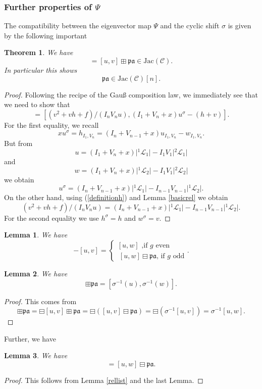\documentclass[11pt, a4paper]{amsart}
\newcommand{\jac}{\mathrm{Jac(\mathcal C)}}
\newcommand{\eqst}[1]{\begin{equation*}#1\end{equation*}}
\theoremstyle{plain}
\newtheorem{theorem}{Theorem}[section]
\newtheorem{lemma}{Lemma}[section]
\numberwithin{equation}{section}
\begin{document}
\subsubsection{Further properties of $\Psi$}
The compatibility between the eigenvector map $\Psi$ and the cyclic shift $\sigma$ is given by the following important
\begin{theorem}
\label{torsionpoint}
We have \eqst{[u^\sigma,v^\sigma] = [u,v] \boxplus \mathfrak{pa} \in \jac.}
In particular this shows \eqst{\mathfrak{pa} \in \mathrm{Jac}(\mathcal C)[n].}
\end{theorem}
\begin{proof}
Following the recipe of the Gauß composition law, we immediately see that we need to show that 
\eqst{[u^\sigma,v^\sigma] = [(v^2+v h +f) /(I_n V_n u),(I_1+V_n+x) u^\sigma-(h+v)].}
For the first equality, we recall \eqst{x u^\sigma = h_{I_1,V_n} = (I_n+V_{n-1}+x)u_{I_1,V_n}-w_{I_1,V_n}.}
But from \eqst{u = (I_1+V_n+x)\vert {}^1\mathcal L _1\vert - I_1V_1 \vert{}^2\mathcal L_1\vert} and \eqst{w = (I_1+V_n+x)\vert {}^1\mathcal L _2\vert - I_1V_1 \vert{}^2\mathcal L_2\vert} we obtain \eqst{u^\sigma = (I_n+V_{n-1}+x) \vert{}^1\mathcal L _1 \vert - I_{n-1} V_{n-1} \vert{}^1 \mathcal L _2 \vert.}
On the other hand, using (\ref{definitionh}) and Lemma \ref{basicrel} we obtain \eqst{(v^2+vh+f)/(I_nV_n u) = (I_n+V_{n-1}+x) \vert{}^1 \mathcal L _1\vert - I_{n-1}V_{n-1}\vert {}^1 \mathcal L _ 2\vert.}
For the second equality we use $h^\sigma = h$ and $w^\sigma = v$.
\end{proof}

\begin{lemma}
We have \eqst{-[u,v] =  \left\{ \begin{array}{c} [u,w] \text{ ,if $g$ even} \\  \  [u,w] \boxminus \mathfrak{pa} \text{, if $g$ odd}  \end{array} . \right.} 
\end{lemma}

\begin{lemma}
We have \eqst{[u,w] \boxplus \mathfrak{pa} = [\sigma^{-1}(u),\sigma^{-1}(w)].}
\end{lemma}
\begin{proof}
This comes from \eqst{[u,w]\boxplus \mathfrak {pa} = \boxminus [u,v] \boxplus \mathfrak{pa} = \boxminus([u,v]\boxminus \mathfrak{pa}) = \boxminus(\sigma^{-1}[u,v]) = \sigma^{-1}[u,w].}
\end{proof}
\noindent Further, we have 
\begin{lemma}
We have \eqst{[u^\dagger,v^\dagger] = {[u,w]} \boxminus \mathfrak{pa}.}
\end{lemma}
\begin{proof}
This follows from Lemma \ref{rellist} and the last Lemma.
\end{proof}
\end{document}
